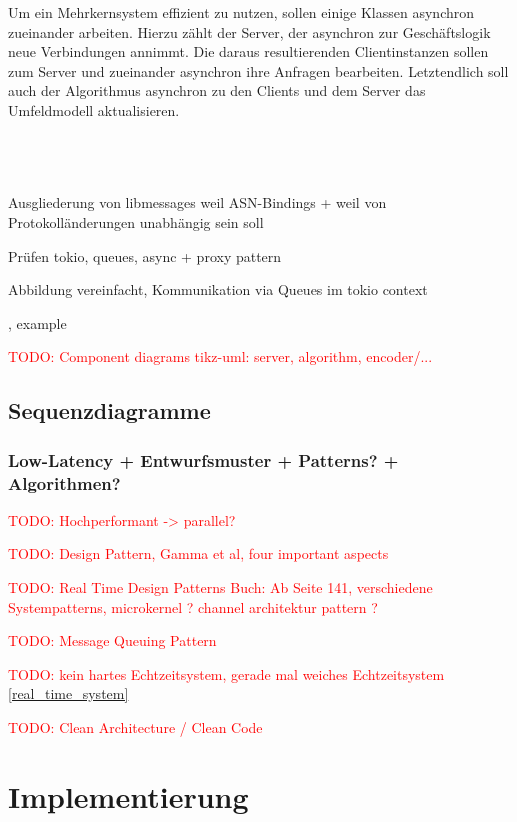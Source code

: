 \documentclass[
	12pt,
	table,
	bigheadings,
	ngerman,
	a4paper,
	BCOR5mm,
	DIV14,
	1.1headlines,
	pagesize,
	oneside,
	openright,
	titlepage,
	headsepline,
	nochapterprefix,
	bibtotoc,
	tocindent,
	listsindent,
	pointlessnumbers,
	cleardoubleempty,
	fleqn,
	halfparskip
]{scrbook}
\newcommand{\todo}[1]{\textcolor{red}{TODO: #1}}
\begin{document}
		Um ein Mehrkernsystem effizient zu nutzen, sollen einige Klassen asynchron zueinander arbeiten.
		Hierzu zählt der Server, der asynchron zur Geschäftslogik neue Verbindungen annimmt.
		Die daraus resultierenden Clientinstanzen sollen zum Server und zueinander asynchron ihre Anfragen bearbeiten.
		Letztendlich soll auch der Algorithmus asynchron zu den Clients und dem Server das Umfeldmodell aktualisieren.
		
		
		~\\ ~\\ ~\\
		
		
		
		
		
		
		Ausgliederung von libmessages weil ASN-Bindings + weil von Protokolländerungen unabhängig sein soll
		
		Prüfen tokio, queues, async + proxy pattern
		
		Abbildung vereinfacht, Kommunikation via Queues im tokio context
		
		
		\cite[446]{goll2012methoden}, example \cite[457]{goll2012methoden}
		  
		\todo{Component diagrams tikz-uml: server, algorithm, encoder/...}		
		
		\section{Sequenzdiagramme}
		
		\subsection{Low-Latency + Entwurfsmuster + Patterns? + Algorithmen?}
		\todo{Hochperformant -> parallel?}
		
		\todo{Design Pattern, Gamma et al, four important aspects}
		
		\todo{Real Time Design Patterns Buch: Ab Seite 141, verschiedene Systempatterns, microkernel \cite[151]{douglass2003real}? channel architektur pattern \cite[167]{douglass2003real}?}
		
		\todo{Message Queuing Pattern \cite[207]{douglass2003real}}
		
		\todo{kein hartes Echtzeitsystem, gerade mal weiches Echtzeitsystem \autoref{real_time_system}}
		
		\todo{Clean Architecture / Clean Code}
	
	\chapter{Implementierung}
	
\end{document}
